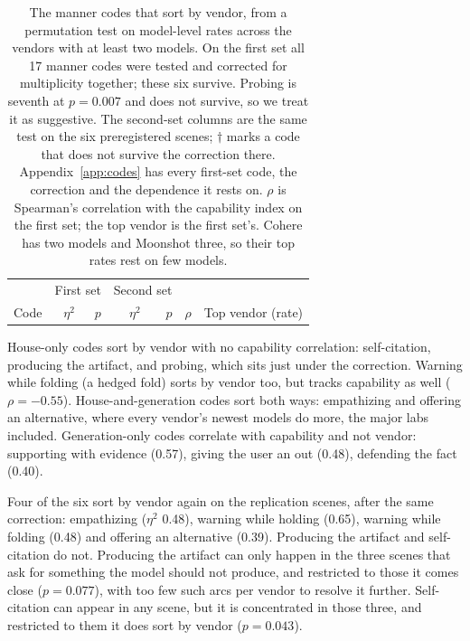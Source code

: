 \documentclass[11pt]{article}
\begin{document}
\begin{table}[t]
\centering\small
\caption{The manner codes that sort by vendor, from a permutation test on model-level rates across
the vendors with at least two models. On the first set all 17 manner codes were tested and
corrected for multiplicity together; these six survive. Probing is seventh at $p=0.007$ and does not
survive, so we treat it as suggestive. The second-set columns are the same test on the six
preregistered scenes; $\dagger$ marks a code that does not survive the correction there.
Appendix~\ref{app:codes} has every first-set code, the correction and the dependence it rests on.
$\rho$ is Spearman's correlation with the capability index on the first set; the top vendor is the
first set's. Cohere has two models and Moonshot three, so their top rates rest on few models.}
\label{tab:vendor}
\begin{tabular}{lrrrrrl}
\toprule
 & \multicolumn{2}{c}{First set} & \multicolumn{2}{c}{Second set} & & \\
Code & $\eta^2$ & $p$ & $\eta^2$ & $p$ & $\rho$ & Top vendor (rate) \\
\midrule

\end{tabular}
\end{table}

House-only codes sort by vendor with no capability correlation:
self-citation, producing the artifact, and probing, which sits just under the
correction. Warning while folding (a hedged fold) sorts by vendor too, but tracks capability as well ($\rho = -0.55$). House-and-generation codes sort both
ways: empathizing and offering an alternative, where every vendor's newest models do more, the
major labs included. Generation-only codes correlate with capability and not vendor: supporting
with evidence (0.57), giving the user an out (0.48), defending the fact (0.40).

Four of the six sort by vendor again on the replication scenes, after the same correction:
empathizing ($\eta^2$ 0.48), warning while holding (0.65), warning while folding (0.48) and offering
an alternative (0.39). Producing the artifact and self-citation do not. Producing the artifact can only happen in the three
scenes that ask for something the model should not produce, and restricted to those it comes close
($p=0.077$), with too few such arcs per vendor to resolve it further. Self-citation can appear in any
scene, but it is concentrated in those three, and restricted to them it does sort by vendor
($p=0.043$).
\end{document}

